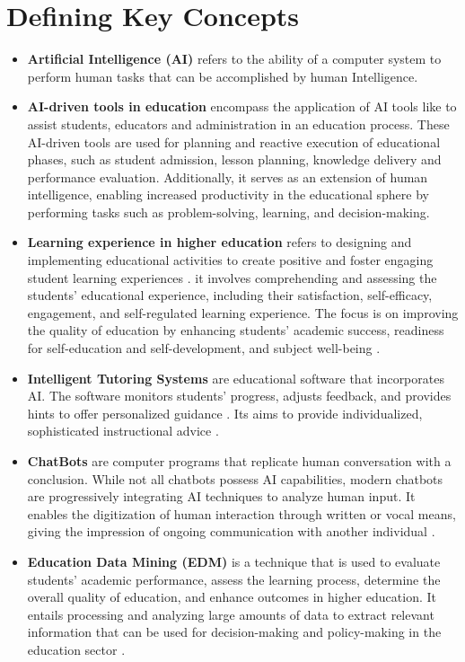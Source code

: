 \section{Defining Key Concepts}\label{sec:defining-key-concepts}
\begin{itemize}
	\item \textbf{Artificial Intelligence (AI)}\label{AI} refers to the ability of a computer system to perform human
	tasks that can be accomplished by human Intelligence\citep{sadiku_ai_2021}.
	\item \textbf{AI-driven tools in education} encompass the application of AI tools like  to assist 
	students, educators and administration in an education process.
	These AI-driven tools are used for planning and reactive execution of educational phases, such as
	student admission, lesson planning, knowledge delivery and performance evaluation\citep{mallik_proactive_2023}.
	Additionally, it serves as an extension of human intelligence, enabling
	increased productivity in the educational sphere by performing tasks
	such as problem-solving, learning, and decision-making\citep{cheng_widespread_2023}.
	\item \textbf{Learning experience in higher education}  refers to designing and implementing educational activities to create 
	positive and foster engaging student learning experiences \citep{kang_supporting_2023}.
	it involves comprehending and assessing the students’ educational experience, including 
	their satisfaction, self-efficacy, engagement, and self-regulated learning experience\citep{lyz_students_2022}.
	The focus is on improving the quality of education by enhancing students’ academic success, 
	readiness for self-education and self-development, and subject well-being \citep{iordache-platis_building_2018}.
	\item \textbf{Intelligent Tutoring Systems}
	are educational software that incorporates AI. The software monitors students' 
	progress, adjusts feedback, and provides hints to offer personalized 
	guidance \citep{shute_intelligent_2010}. Its aims to provide individualized, sophisticated instructional advice
	\citep{sedlmeier_intelligent_2001}.
	\item \textbf{ ChatBots }\label{chatbot} are computer programs that replicate human conversation with a conclusion. 
	While not all chatbots possess AI capabilities, modern chatbots are progressively 
	integrating AI techniques to analyze human input\citep{IBM_withnodate}.
	It enables the digitization of human interaction through written 
	or vocal means, giving the impression of ongoing communication with another individual \citep{oracle_what_nodate}.
	\item \textbf{Education Data Mining (EDM)}  is a technique that is used to evaluate students' academic performance, 
	assess the learning process, determine the overall quality of education, and enhance outcomes in higher education. 
	It entails processing and analyzing large amounts of data to extract relevant information that can be used for 
	decision-making and policy-making in the education sector \citep{arifin_using_2022}.
\end{itemize}

